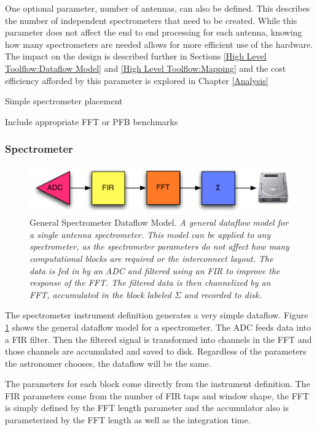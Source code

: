 One optional parameter, number of antennas, can also be defined. 
This describes the number of independent spectrometers that need to be created.
While this parameter does not affect the end to end processing for each antenna, knowing how many spectrometers are needed allows for more efficient use of the hardware.
The impact on the design is described further in Sections \ref{High Level Toolflow:Dataflow Model} and \ref{High Level Toolflow:Mapping} and the cost efficiency afforded by this parameter is explored in Chapter \ref{Analysis}

Simple spectrometer placement

Include appropriate FFT or PFB benchmarks

\subsubsection{Spectrometer}

\begin{figure}[ht!]
  \centering
    \includegraphics[width=1\textwidth]{Images/C4/spectrometer_dataflow.pdf}
  \caption[General Spectrometer Dataflow Model]{General Spectrometer Dataflow Model.
  \textit{
  A general dataflow model for a single antenna spectrometer. 
  This model can be applied to any spectrometer, as the spectrometer parameters do not affect how many computational blocks are required or the interconnect layout. 
  The data is fed in by an ADC and filtered using an FIR to improve the response of the FFT.
  The filtered data is then channelized by an FFT, accumulated in the block labeled $\Sigma$ and recorded to disk.
  }}
  \label{fig: C4/spectrometer_dataflow.pdf}
\end{figure}

The spectrometer instrument definition generates a very simple dataflow. 
Figure \ref{fig: C4/spectrometer_dataflow.pdf} shows the general dataflow model for a spectrometer. 
The ADC feeds data into a FIR filter. 
Then the filtered signal is transformed into channels in the FFT and those channels are accumulated and saved to disk. Regardless of the parameters the astronomer chooses, the dataflow will be the same. 

The parameters for each block come directly from the instrument definition. 
The FIR parameters come from the number of FIR taps and window shape, the FFT is simply defined by the FFT length parameter and the accumulator also is parameterized by the FFT length as well as the integration time. 

